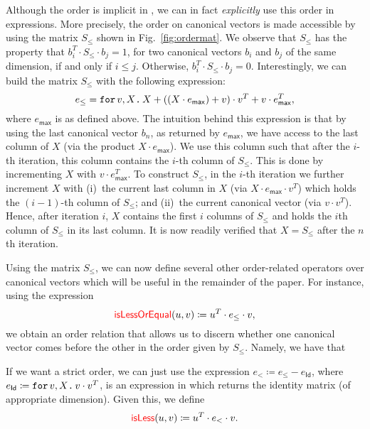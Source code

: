 Although the order is implicit in \langfor, we can in fact \textit{explicitly} use this order in \langfor expressions. More precisely, the order on canonical vectors is made accessible by
using the matrix $S_\leq$ shown in Fig.~\ref{fig:ordermat}.
We observe that $S_{\leq}$ has the property that $b_i^T\cdot S_{\leq} \cdot b_j=1$, for two canonical vectors $b_i$ and $b_j$ of the same dimension, if and only if $i\leq j$. Otherwise, $b_i^T\cdot S_{\leq} \cdot b_j=0$. 
Interestingly, we can build the matrix $S_{\leq}$ with the following \langfor expression:
$$
e_{\leq}=\texttt{for}\, v,X \texttt{.}\, X + \left((X\cdot e_{\mathsf{max}}) + v \right)\cdot v^T + v\cdot e^T_{\mathsf{max}},
$$
where $e_{\mathsf{max}}$ is as defined above. The intuition behind this expression is that by using the last canonical vector $b_n$, as returned by $e_{\mathsf{max}}$, we have access to the last column of $X$ (via the product $X\cdot e_{\mathsf{max}}$). We use this column such that after the $i$-th iteration, this column contains the $i$-th column of $S_{\leq}$. This is done by incrementing $X$ with $v\cdot e_{\mathsf{max}}^T$.
To construct $S_{\leq}$, in the $i$-th iteration we further increment $X$ with 
(i)~the current last column in $X$ (via $X\cdot e_{\mathsf{max}}\cdot v^T$) which holds
the $(i-1)$-th column of $S_{\leq}$; and (ii)~the current canonical vector (via $v\cdot v^T$). Hence, after iteration $i$, $X$ contains the first $i$ columns of $S_{\leq}$ and holds the $i$th column of $S_{\leq}$ in its last column. It is now readily verified that $X=S_{\leq}$ after the $n$th iteration.

Using the matrix $S_\leq$, we can now define several other order-related operators over canonical vectors which will be useful in the remainder of the paper. For instance, using the expression 
$$
{\color{red} \mathsf{isLessOrEqual}}(u,v) \coloneqq  u^T\cdot e_{\leq} \cdot v,
$$
we obtain an order relation that allows us to discern whether one canonical vector comes before 
the other in the order given by $S_{\leq}$. Namely, we have that 

If we want a strict order, we can just use the expression
$e_< \coloneqq  e_{\leq} - e_{\mathsf{Id}}$, where $e_{\mathsf{Id}} \coloneqq  \texttt{for}\, v,X \texttt{.}\, v\cdot v^T$, is an expression in \langfor which returns the identity matrix (of appropriate dimension). Given this, we define
$${\color{red} \mathsf{isLess}}(u,v) \coloneqq  u^T\cdot e_{<} \cdot v.$$

